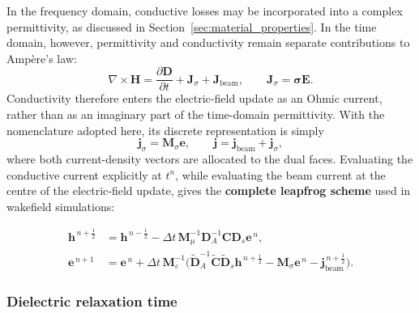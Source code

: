 In the frequency domain, conductive losses may be incorporated into a complex permittivity, as discussed in Section~\ref{sec:material_properties}. In the time domain, however, permittivity and conductivity remain separate contributions to Ampère's law:
%
\begin{equation}
\nabla\times\mathbf{H}
=
\frac{\partial\mathbf{D}}{\partial t}
+\mathbf{J}_{\sigma} +\mathbf{J}_{\mathrm{beam}},
\qquad
\mathbf{J}_{\sigma}
=
\boldsymbol{\sigma}\mathbf{E}.
\label{eq:ampere_conductive_current}
\end{equation}
%
Conductivity therefore enters the electric-field update as an Ohmic current, rather than as an imaginary part of the time-domain permittivity. With the nomenclature adopted here, its discrete representation is simply
%
\begin{equation}
\mathbf{j}_{\sigma}
=
\mathbf{M}_{\sigma}\mathbf{e},
\qquad
\mathbf{j}
=
\mathbf{j}_{\mathrm{beam}}
+\mathbf{j}_{\sigma},
\label{eq:total_current_beam_conduction}
\end{equation}
%
where both current-density vectors are allocated to the dual faces. Evaluating the conductive current explicitly at $t^n$, while evaluating the beam current at the centre of the electric-field update, gives the \textbf{complete leapfrog scheme} used in wakefield simulations:

\begin{equation}
\boxed{
\begin{aligned}
\mathbf{h}^{\,n+\frac{1}{2}}
&=
\mathbf{h}^{\,n-\frac{1}{2}}
-\Delta t\,
\mathbf{M}_{\mu}^{-1}
\mathbf{D}_A^{-1}
\mathbf{C}\mathbf{D}_s\mathbf{e}^{\,n},
\\[5mm]
\mathbf{e}^{\,n+1}
&=
\mathbf{e}^{\,n}
+\Delta t\,
\mathbf{M}_{\varepsilon}^{-1}
\bigg(
\widetilde{\mathbf{D}}_A^{-1}
\widetilde{\mathbf{C}}\widetilde{\mathbf{D}}_s
\mathbf{h}^{\,n+\frac{1}{2}}
-\mathbf{M}_{\sigma}\mathbf{e}^{\,n} -\mathbf{j}_{\mathrm{beam}}^{\,n+\frac{1}{2}}
\bigg).
\end{aligned}}
\label{eq:fit_leapfrog_explicit_losses}
\end{equation}

\subsubsection{Dielectric relaxation time}
\label{sec:dielectric_relaxation_time}

